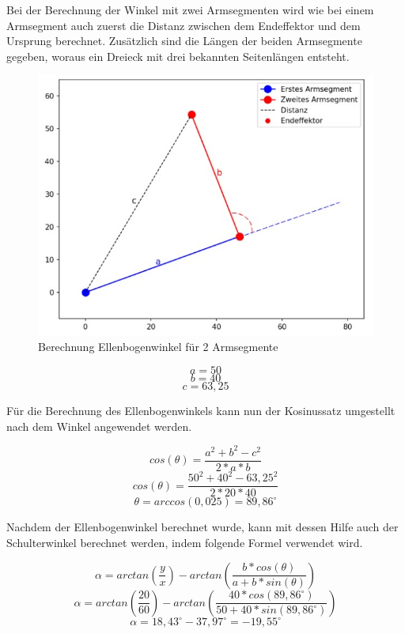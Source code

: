 \documentclass[12pt]{article}
\begin{document}
    Bei der Berechnung der Winkel mit zwei Armsegmenten wird wie bei einem Armsegment auch zuerst
    die Distanz zwischen dem Endeffektor und dem Ursprung berechnet. Zusätzlich sind die Längen der
    beiden Armsegmente gegeben, woraus ein Dreieck mit drei bekannten Seitenlängen entsteht.

    \begin{figure}[h]
        \centering
        \includegraphics[width = \linewidth]{Bild 3}
        \caption{Berechnung Ellenbogenwinkel für 2 Armsegmente}
    \end{figure}

    \[
        a=50
    \]
    \[
        b=40
    \]
    \[
        c=63,25
    \]

    Für die Berechnung des Ellenbogenwinkels kann nun der Kosinussatz umgestellt nach dem Winkel
    angewendet werden.

    \[
        cos(\theta)= \frac{a^2+b^2-c^2}{2*a*b}
    \]
    \[
        cos(\theta)= \frac{50^2+40^2-63,25^2}{2*20*40}
    \]
    \[
        \theta= arccos(0,025) = 89,86^\circ
    \]

    Nachdem der Ellenbogenwinkel berechnet wurde, kann mit dessen Hilfe auch der Schulterwinkel
    berechnet werden, indem folgende Formel verwendet wird.

    \[
        \alpha = arctan(\frac{y}{x}) - arctan(\frac{b*cos(\theta)}{a+b*sin(\theta)})
    \]
    \[
        \alpha = arctan(\frac{20}{60}) - arctan(\frac{40*cos(89,86^\circ)}{50+40*sin(89,86^\circ)})                    \]
    \[
        \alpha = 18,43^\circ - 37,97^\circ = -19,55^\circ
    \]
\end{document}
